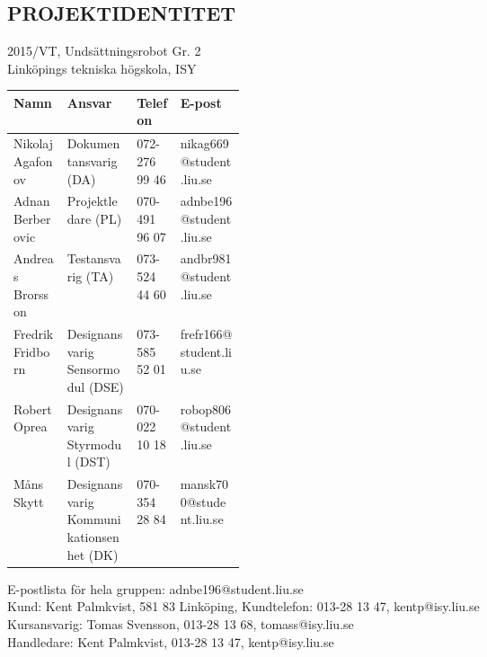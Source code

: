 \documentclass[11pt]{article}
\begin{document}
\pagebreak
\begin{center}

\section*{PROJEKTIDENTITET}
2015/VT, Undsättningsrobot Gr. 2
\\
Linköpings tekniska högskola, ISY
\\[0.5in]
\begin{table}[h]
\begin{tabular}{|l|p{0.3\linewidth}|l|l|} \hline
Namn & Ansvar & Telefon & E-post \\[0.1in] \hline
Nikolaj Agafonov & Dokumentansvarig (DA) & 072-276 99 46 & nikag669@student.liu.se \\ \hline
Adnan Berberovic & Projektledare (PL) & 070-491 96 07 & adnbe196@student.liu.se \\ \hline
Andreas Brorsson & Testansvarig (TA) & 073-524 44 60 & andbr981@student.liu.se \\ \hline
Fredrik Fridborn & Designansvarig Sensormodul (DSE) & 073-585 52 01 & frefr166@student.liu.se \\ \hline
Robert Oprea & Designansvarig Styrmodul (DST) & 070-022 10 18 & robop806@student.liu.se \\ \hline
Måns Skytt & Designansvarig Kommunikationsenhet (DK) & 070-354 28 84 & mansk700@student.liu.se \\ \hline
\end{tabular}
\end{table}

E-postlista för hela gruppen: adnbe196@student.liu.se
\\[1in]
Kund: Kent Palmkvist, 581 83 Linköping,
Kundtelefon: 013-28 13 47, kentp@isy.liu.se
\\[1in]
Kursansvarig: Tomas Svensson, 013-28 13 68, tomass@isy.liu.se
\\
Handledare: Kent Palmkvist, 013-28 13 47, kentp@isy.liu.se
\end{center}
\pagebreak

\tableofcontents

\pagebreak
\end{document}
